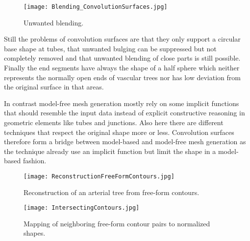 \begin{figure}[h]
	\centering
	\texttt{[image: Blending\_ConvolutionSurfaces.jpg]} \\
	\caption{Unwanted blending.}
	\cite{oeltze2005visualization}
	\label{fig:Blending_ConvolutionSurfaces}
\end{figure}

Still the problems of convolution surfaces are that they only support a circular base shape at tubes, that unwanted bulging can be suppressed but not completely removed and that unwanted blending of close parts is still possible. Finally the end segments have always the shape of a half sphere which neither represents the normally open ends of vascular trees nor has low deviation from the original surface in that areas.

In contrast model-free mesh generation mostly rely on some implicit functions that should resemble the input data instead of explicit constructive reasoning in geometric elements like tubes and junctions. Also here there are different techniques that respect the original shape more or less. Convolution surfaces therefore form a bridge between model-based and model-free mesh generation as the technique already use an implicit function but limit the shape in a model-based fashion.

\begin{figure}[h]
	\centering
	\texttt{[image: ReconstructionFreeFormContours.jpg]} \\
	\caption{Reconstruction of an arterial tree from free-form contours.}
	\cite{kretschmer2012reliable}
	\label{fig:ReconstructionFreeFormContours}
\end{figure} 

\begin{figure}[h]
	\centering
	\texttt{[image: IntersectingContours.jpg]} \\
	\caption{Mapping of neighboring free-form contour pairs to normalized shapes.}
	\cite{kretschmer2012reliable}
	\label{fig:IntersectingContours}
\end{figure} 

